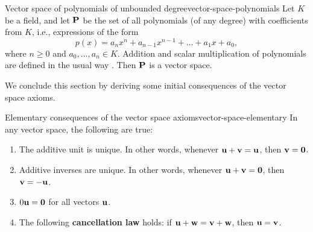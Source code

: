 \begin{example}{Vector space of polynomials of unbounded degree}{vector-space-polynomials}
  Let $K$ be a field, and let $\mathbf{P}$%
   be the set of all polynomials%
   (of any degree) with coefficients from $K$, i.e.,
  expressions of the form
  \begin{equation*}
    p(x) = a_nx^n + a_{n-1}x^{n-1} + \ldots + a_1x + a_0,
  \end{equation*}
  where $n\geq 0$ and $a_0,\ldots,a_n\in K$. Addition and scalar
  multiplication of polynomials are defined in the usual way
  .
  Then $\mathbf{P}$ is a vector space.
\end{example}

We conclude this section by deriving some initial consequences of the
vector space axioms.

\begin{proposition}{Elementary consequences of the vector space axioms}{vector-space-elementary}
  In any vector space, the following are true:
  \begin{enumialphparenastyle}
    \begin{enumerate}
    \item The additive unit is unique. In other words, whenever
      $\vect{u}+\vect{v}=\vect{u}$, then $\vect{v}=\vect{0}$.
    \item Additive inverses are unique. In other words, whenever
      $\vect{u}+\vect{v}=\vect{0}$, then $\vect{v}=-\vect{u}$. 
    \item\label{vector-space-elementary-c} $0\vect{u}=\vect{0}$ for
      all vectors $\vect{u}$.
    \item The following \textbf{cancellation law}%
      holds: if $\vect{u} + \vect{w} = \vect{v} + \vect{w}$, then
      $\vect{u} = \vect{v}$.
    \end{enumerate}
  \end{enumialphparenastyle}
\end{proposition}

